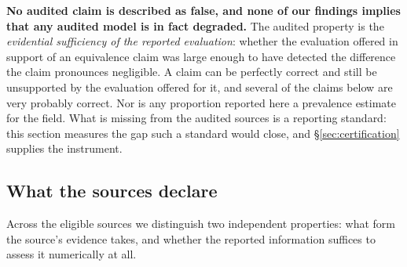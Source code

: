 \textbf{No audited claim is described as false, and none of our findings implies
that any audited model is in fact degraded.} The audited property is the
\emph{evidential sufficiency of the reported evaluation}: whether the evaluation
offered in support of an equivalence claim was large enough to have detected the
difference the claim pronounces negligible. A claim can be perfectly correct and
still be unsupported by the evaluation offered for it, and several of the claims
below are very probably correct. Nor is any proportion reported here a
prevalence estimate for the field. What is missing from the audited sources is a
reporting standard: this section measures the gap such a standard would close,
and \S\ref{sec:certification} supplies the instrument.


\subsection{What the sources declare}
\label{sec:audit:taxonomy}

%
%
Across the \AuditEligible{} eligible sources we distinguish two independent
properties: what form the source's evidence takes, and whether the reported
information suffices to assess it numerically at all.

